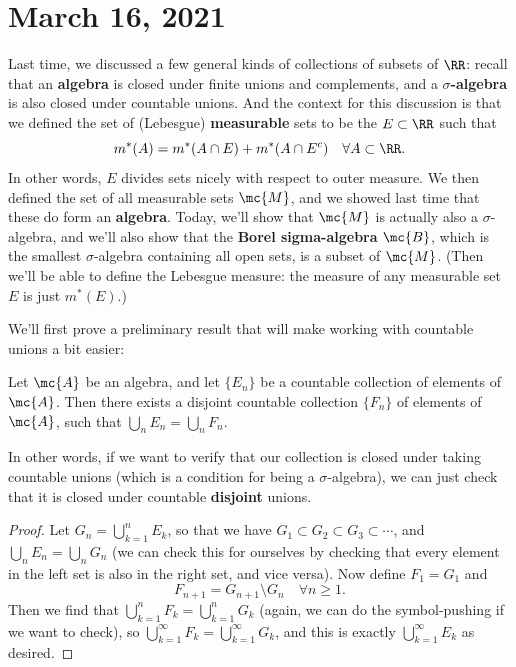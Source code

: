 
\pagebreak\section*{March 16, 2021}

Last time, we discussed a few general kinds of collections of subsets of $\RR$: recall that an \textbf{algebra} is closed under finite unions and complements, and a \textbf{$\sigma$-algebra} is also closed under countable unions. And the context for this discussion is that we defined the set of (Lebesgue) \textbf{measurable} sets to be the $E \subset \RR$ such that
\[
    m^\ast(A) = m^\ast(A \cap E) + m^\ast(A \cap E^c) \quad \forall A \subset \RR.
\]
In other words, $E$ divides sets nicely with respect to outer measure. We then defined the set of all measurable sets $\mc{M}$, and we showed last time that these do form an \textbf{algebra}. Today, we'll show that $\mc{M}$ is actually also a $\sigma$-algebra, and we'll also show that the \textbf{Borel sigma-algebra} $\mc{B}$, which is the smallest $\sigma$-algebra containing all open sets, is a subset of $\mc{M}$. (Then we'll be able to define the Lebesgue measure: the measure of any measurable set $E$ is just $m^\ast(E)$.)

We'll first prove a preliminary result that will make working with countable unions a bit easier: 

\begin{lemma}\label{countabledisjoint}
Let $\mc{A}$ be an algebra, and let $\{E_n\}$ be a countable collection of elements of $\mc{A}$. Then there exists a disjoint countable collection $\{F_n\}$ of elements of $\mc{A}$, such that $\bigcup_n E_n = \bigcup_n F_n$. 
\end{lemma}

In other words, if we want to verify that our collection is closed under taking countable unions (which is a condition for being a $\sigma$-algebra), we can just check that it is closed under countable \textbf{disjoint} unions.

\begin{proof}
Let $G_n = \bigcup_{k=1}^n E_k$, so that we have $G_1 \subset G_2 \subset G_3 \subset \cdots$, and $\bigcup_n E_n = \bigcup_n G_n$ (we can check this for ourselves by checking that every element in the left set is also in the right set, and vice versa). Now define $F_1 = G_1$ and
\[
    F_{n+1} = G_{n+1} \setminus G_n \quad \forall n \ge 1.
\]
Then we find that $\bigcup_{k=1}^n F_k = \bigcup_{k=1}^n G_k$ (again, we can do the symbol-pushing if we want to check), so $\bigcup_{k=1}^{\infty} F_k = \bigcup_{k=1}^{\infty} G_k$, and this is exactly $\bigcup_{k=1}^{\infty} E_k$ as desired.
\end{proof}

